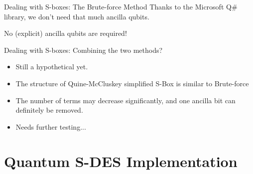 \documentclass{beamer}
\begin{document}
    \begin{frame}{Dealing with S-boxes: The Brute-force Method}
    Thanks to the Microsoft Q\# library, we don't need that much ancilla qubits.
    \begin{center}
    \end{center}
    No (explicit) ancilla qubits are required!
    \end{frame}

    \begin{frame}{Dealing with S-boxes: Combining the two methods?}
        \begin{itemize}
            \item Still a hypothetical yet.
            \item The structure of Quine-McCluskey simplified S-Box is similar to Brute-force
            \item The number of terms may decrease significantly, and one ancilla bit can definitely be removed.
            \item Needs further testing...
        \end{itemize}
    \end{frame}

    \section{Quantum S-DES Implementation}
\end{document}

